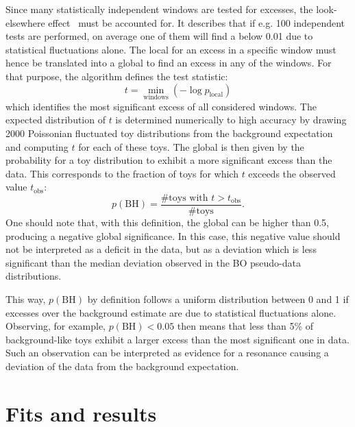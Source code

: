 Since many statistically independent windows are tested for excesses, the look-elsewhere effect~\cite{LookElsewhereEffect} must be accounted for. It describes that if e.g. 100 independent tests are performed, on average one of them will find a \pval below 0.01 due to statistical fluctuations alone. The local \pval for an excess in a specific window must hence be translated into a global \pval to find an excess in any of the windows. For that purpose, the \bh algorithm defines the test statistic:
\begin{equation}
    \label{eq:strategy:stat_treatment:bh:bh_statistic}
    t = \min_{\text{windows}} \left( - \log p_{\text{local}} \right)
\end{equation}
which identifies the most significant excess of all considered windows. The expected distribution of \(t\) is determined numerically to high accuracy by drawing 2000 Poissonian fluctuated toy distributions from the background expectation and computing \(t\) for each of these toys. The global \bh \pval is then given by the probability for a toy distribution to exhibit a more significant excess than the data. This corresponds to the fraction of toys for which \(t\) exceeds the observed value \(t_{\text{obs}}\):
\begin{equation}
    \label{eq:strategy:stat_treatment:bh:bh_pval}
    p(\text{BH}) = \frac{\text{\# toys with } t > t_{\text{obs}}}{\text{\# toys}}.
\end{equation}
One should note that, with this definition, the global \pval can be higher than 0.5, producing a negative global significance. In this case, this negative value should not be interpreted as a deficit in the data, but as a deviation which is less significant than the median deviation observed in the \ac{BO} pseudo-data distributions.

This way, \(p(\text{BH})\) by definition follows a uniform distribution between 0 and 1 if excesses over the background estimate are due to statistical fluctuations alone. Observing, for example, \(p(\text{BH}) < 0.05\) then means that less than 5\% of background-like toys exhibit a larger excess than the most significant one in data. Such an observation can be interpreted as evidence for a resonance causing a deviation of the data from the background expectation.


\section{Fits and results}
\label{sec:strategy:stat_treatment:fits_results}


